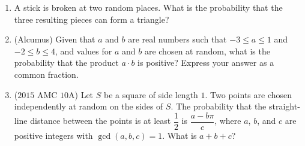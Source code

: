 \documentclass[a4paper]{article}
\begin{document}
\begin{enumerate}[itemsep=2.85cm]
    \item A stick is broken at two random places. What is the probability that the three resulting pieces can form a triangle?

    \item (Alcumus) Given that $a$ and $b$ are real numbers such that $-3\leq a\leq1$ and $-2\leq b\leq 4$, and values for $a$ and $b$ are chosen at random, what is the probability that the product $a\cdot b$ is positive? Express your answer as a common fraction. 

    \item ($2015$ AMC $10$A) Let $S$ be a square of side length $1$. Two points are chosen independently at random on the sides of $S$. The probability that the straight-line distance between the points is at least $\dfrac{1}{2}$ is $\dfrac{a-b\pi}{c}$, where $a$, $b$, and $c$ are positive integers with $\gcd(a,b,c)=1$. What is $a+b+c$?
\end{enumerate}
\end{document}
